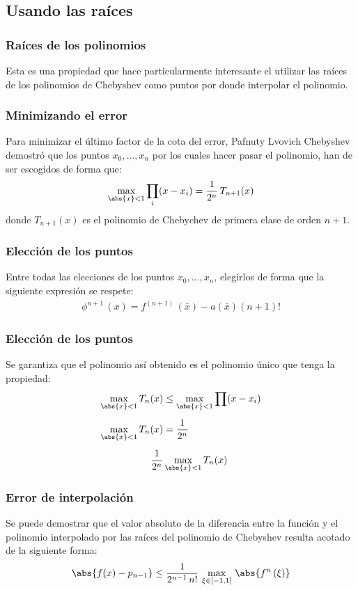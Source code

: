 \subsection{Usando las raíces}
\begin{frame}
\frametitle{Raíces de los polinomios}
Esta es una propiedad que hace particularmente interesante el utilizar las raíces de los polinomios de Chebyshev como puntos por donde interpolar el polinomio.
\end{frame}
\begin{frame}
\frametitle{Minimizando el error}
Para minimizar el último factor de la cota del error, Pafnuty Lvovich Chebyshev demostró que los puntos $x_{0}, \ldots, x_{n}$ por los cuales hacer pasar el polinomio, han de ser escogidos de forma que:
\begin{align*}
\max_{\abs{x}<1} \prod_{i} (x - x_{i}) = \dfrac{1}{2^{n}} \, T_{n+1} (x)
\end{align*}
donde $T_{n+1}(x)$ es el polinomio de Chebychev de primera clase de orden $n + 1$.
\end{frame}
\begin{frame}
\frametitle{Elección de los puntos}
Entre todas las elecciones de los puntos $x_{0}, \ldots, x_{n}$, elegirlos de forma que la siguiente expresión se respete:
\begin{align*}
\phi^{n+1} \, (x) = f^{(n+1)} \, (\bar{x}) - a (\bar{x}) (n + 1)!
\end{align*}
\end{frame}
\begin{frame}
\frametitle{Elección de los puntos}
Se garantiza que el polinomio así obtenido es el polinomio único que tenga la propiedad:
\begin{align*}
\max_{\abs{x}<1} T_{n} (x) &\leq \max_{\abs{x}<1} \prod (x - x_{i}) \\[0.5em]
\max_{\abs{x}<1} T_{n} (x) &= \dfrac{1}{2^{n}} \\[0.5em]
\dfrac{1}{2^{n}} & \max_{\abs{x}<1} T_{n} (x)
\end{align*}
\end{frame}
\begin{frame}
\frametitle{Error de interpolación}
Se puede demostrar que el valor absoluto de la diferencia entre la función y el polinomio interpolado por las raíces del polinomio de Chebyshev resulta acotado de la siguiente forma:
\begin{align*}
\abs{f(x) - p_{n-1}} \leq \dfrac{1}{2^{n-1} \, n!} \, \max_{\xi \in [-1, 1]}  \, \abs{f^{n} \, (\xi)}
\end{align*}
\end{frame}
